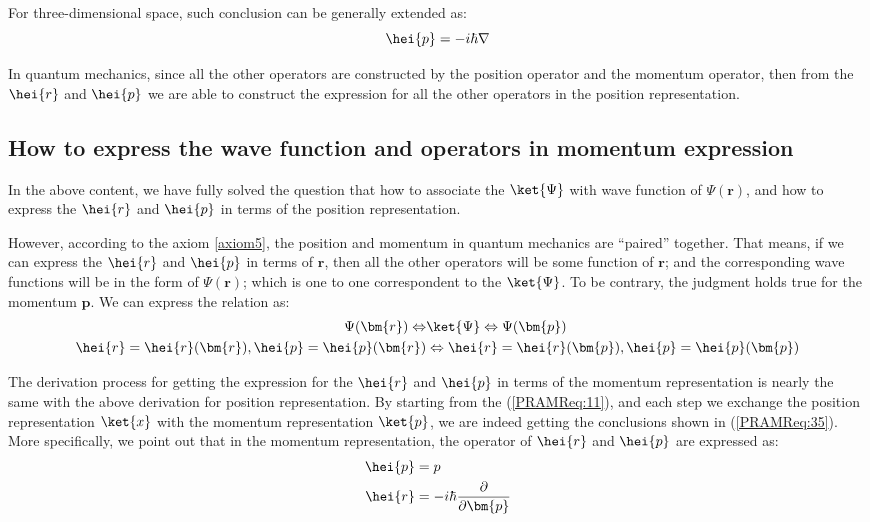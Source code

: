 For three-dimensional space, such conclusion can be generally
extended as:
\begin{equation}
  \label{PRAMReq:34}
  \hei{p} =  -i\hbar \nabla
\end{equation}

In quantum mechanics, since all the other operators are constructed
by the position operator and the momentum operator, then from the
$\hei{r}$ and $\hei{p}$ we are able to construct the expression for
all the other operators in the position representation.

\subsection{How to express the wave function and operators
in momentum expression}
\label{sec:momentum_operator_in_position_momentum}
%
%
%
%
%
In the above content, we have fully solved the question that how to
associate the $\ket{\Psi}$ with wave function of $\Psi(\bm{r})$, and
how to express the $\hei{r}$ and $\hei{p}$ in terms of the position
representation.

However, according to the axiom \ref{axiom5}, the position and
momentum in quantum mechanics are ``paired'' together. That means,
if we can express the $\hei{r}$ and $\hei{p}$ in terms of $\bm{r}$,
then all the other operators will be some function of $\bm{r}$; and
the corresponding wave functions will be in the form of
$\Psi(\bm{r})$; which is one to one correspondent to the
$\ket{\Psi}$. To be contrary, the judgment holds true for the
momentum $\bm{p}$. We can express the relation as:
\begin{align}\label{PRAMReq:35}
 \Psi(\bm{r}) \Leftrightarrow &\ket{\Psi}
 \Leftrightarrow \Psi(\bm{p}) \nonumber \\
\hei{r} = \hei{r}(\bm{r}), \hei{p} = \hei{p}(\bm{r})
&\Leftrightarrow \hei{r} = \hei{r}(\bm{p}), \hei{p} =
\hei{p}(\bm{p})
\end{align}

The derivation process for getting the expression for the $\hei{r}$
and $\hei{p}$ in terms of the momentum representation is nearly the
same with the above derivation for position representation. By
starting from the (\ref{PRAMReq:11}), and each step we exchange the
position representation $\ket{x}$ with the momentum representation
$\ket{p}$, we are indeed getting the conclusions shown in
(\ref{PRAMReq:35}). More specifically, we point out that in the
momentum representation, the operator of $\hei{r}$ and $\hei{p}$ are
expressed as:
\begin{align}\label{PRAMReq:36}
\hei{p} &= p \nonumber \\
\hei{r} &= -i\hbar \frac{\partial}{\partial \bm{p}}
\end{align}




